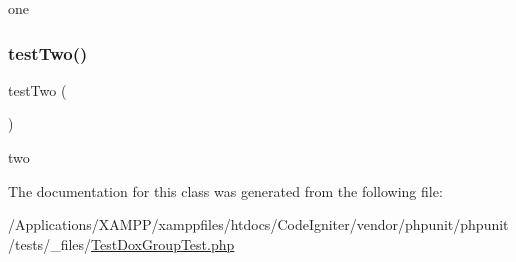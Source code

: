 one \mbox{\label{class_test_dox_group_test_a4fb9974ce113d5d1db8075e0db0dc9b6}} 
\subsubsection{\texorpdfstring{test\+Two()}{testTwo()}}
{\footnotesize\ttfamily test\+Two (\begin{DoxyParamCaption}{ }\end{DoxyParamCaption})}

two 

The documentation for this class was generated from the following file\+:\begin{DoxyCompactItemize}
\item 
/\+Applications/\+X\+A\+M\+P\+P/xamppfiles/htdocs/\+Code\+Igniter/vendor/phpunit/phpunit/tests/\+\_\+files/\mbox{\hyperlink{_test_dox_group_test_8php}{Test\+Dox\+Group\+Test.\+php}}\end{DoxyCompactItemize}
